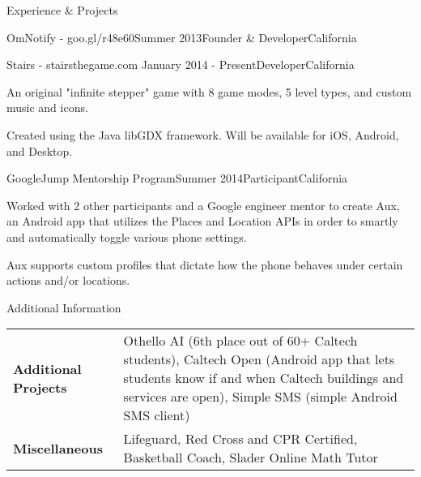 \documentclass{resume} %
\begin{document}
\begin{rSection}{Experience \& Projects}
\begin{rSubsection}{OmNotify - goo.gl/r48e60}{Summer 2013}{Founder \& Developer}{California}
\end{rSubsection}


\begin{rSubsection}{Stairs - stairsthegame.com }{January 2014 - Present}{Developer}{California}
\item An original "infinite stepper" game with 8 game modes,
    5 level types, and custom music and icons.
\item Created using the Java libGDX framework. Will be available for iOS, Android,
    and Desktop.
\end{rSubsection}


\begin{rSubsection}{GoogleJump Mentorship Program}{Summer 2014}{Participant}{California}
\item Worked with 2 other participants and a Google engineer mentor to create Aux,
    an Android app that utilizes the Places and Location APIs in order to smartly
    and automatically toggle various phone settings.
\item Aux supports custom profiles that dictate how the phone behaves
    under certain actions and/or locations.
\end{rSubsection}

\end{rSection}




\begin{rSection}{Additional Information}

\noindent\begin{tabularx}{.98\textwidth}{@{}lX}
    \bfseries{Additional Projects}   &  Othello AI (6th place out of 60+ Caltech
    students),
    Caltech Open (Android app that lets students know if and when Caltech
    buildings and services are open), Simple SMS (simple Android SMS
    client) \\
    \bfseries{Miscellaneous}   &  Lifeguard, Red Cross and CPR Certified, Basketball
    Coach, Slader Online Math Tutor \\
\end{tabularx}

\end{rSection}
\end{document}
